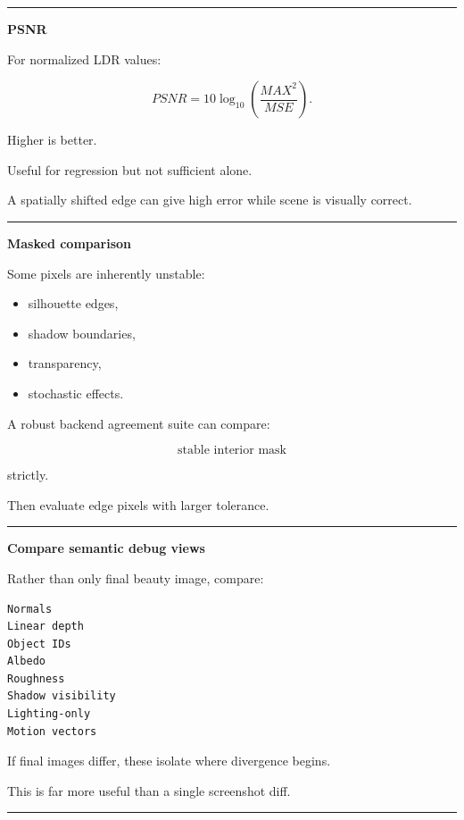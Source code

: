 \begin{center}\rule{0.5\linewidth}{0.5pt}\end{center}

\textbf{PSNR}

For normalized LDR values:

\[
PSNR=
10
\log_{10}
\left(
\frac{MAX^2}{MSE}
\right).
\]

Higher is better.

Useful for regression but not sufficient alone.

A spatially shifted edge can give high error while scene is visually correct.

\begin{center}\rule{0.5\linewidth}{0.5pt}\end{center}

\textbf{Masked comparison}

Some pixels are inherently unstable:

\begin{itemize}
\tightlist
\item
  silhouette edges,
\item
  shadow boundaries,
\item
  transparency,
\item
  stochastic effects.
\end{itemize}

A robust backend agreement suite can compare:

\[
\text{stable interior mask}
\]

strictly.

Then evaluate edge pixels with larger tolerance.

\begin{center}\rule{0.5\linewidth}{0.5pt}\end{center}

\textbf{Compare semantic debug views}

Rather than only final beauty image, compare:

\begin{verbatim}
Normals
Linear depth
Object IDs
Albedo
Roughness
Shadow visibility
Lighting-only
Motion vectors
\end{verbatim}

If final images differ, these isolate where divergence begins.

This is far more useful than a single screenshot diff.

\begin{center}\rule{0.5\linewidth}{0.5pt}\end{center}

